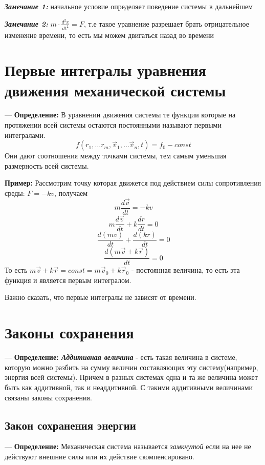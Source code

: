 \documentclass[12pt,a4paper]{report}
\begin{document}
\vspace{5px}

\textbf{\textit{Замечание 1:}} начальное условие определяет поведение системы в дальнейшем

\vspace{5px}

\textbf{\textit{Замечание 2:}} $m \cdot \frac{d^2x}{dt^2} = F$, т.е такое уравнение разрешает брать отрицательное изменение времени, то есть мы можем двигаться назад во времени
\section{Первые интегралы уравнения движения механической системы}
--- \textbf{Определение:} В уравнении движения системы те функции которые на протяжении всей системы остаются постоянными называют первыми интегралами.
\[ f(r_1, \ldots r_m, \vec v_1, \ldots \vec v_n, t) = f_0 - const\]
Они дают соотношения между точками системы, тем самым уменьшая размерность всей системы.

\vspace{6px}

\textbf{Пример:} Рассмотрим точку которая движется под действием силы сопротивления среды: $F = -kv$, получаем
\[ m\frac{d\vec v}{dt} = -kv \]
\[m\frac{d\vec v}{dt} + k\frac{dr}{dt} = 0 \]
\[ \frac{d(mv)}{dt} + \frac{d(kr)}{dt} = 0 \]
\[ \frac{d(m\vec v + k\vec r)}{dt} = 0\]
То есть $m \vec v + k\vec r = const = m\vec v_0 + k\vec r_0$ - постоянная величина, то есть эта функция и является первым интегралом.

Важно сказать, что первые интегралы не зависят от времени.
\section{Законы сохранения}

--- \textbf{Определение: \textit{Аддитивная величина}} - есть такая величина в системе, которую можно разбить на сумму величин составляющих эту систему(например, энергия всей системы). Причем в разных системах одна и та же величина может быть как аддитивной, так и неаддитивной. С такими аддитивными величинами связаны законы сохранения.


\subsection{Закон сохранения энергии}

--- \textbf{Определение:} Механическая система называется \textit{замкнутой} если на нее не действуют внешние силы или их действие скомпенсировано.
\end{document}
